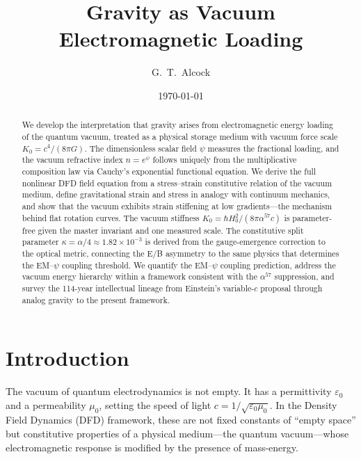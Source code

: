 \documentclass[aps,prd,twocolumn,superscriptaddress,nofootinbib]{revtex4-2}
\begin{document}
\title{Gravity as Vacuum Electromagnetic Loading}

\author{G.~T.~Alcock}

\date{\today}

\begin{abstract}
We develop the interpretation that gravity arises from electromagnetic
energy loading of the quantum vacuum, treated as a physical storage
medium with vacuum force scale $K_0 = c^4/(8\pi G)$.  The dimensionless
scalar field $\psi$ measures the fractional loading, and the vacuum
refractive index $n = e^\psi$ follows uniquely from the multiplicative
composition law via Cauchy's exponential functional equation.  We derive
the full nonlinear DFD field equation from a stress--strain constitutive
relation of the vacuum medium, define gravitational strain and stress
in analogy with continuum mechanics, and show that the vacuum exhibits
strain stiffening at low gradients---the mechanism behind flat rotation
curves.  The vacuum stiffness $K_0 = \hbar H_0^2/(8\pi\alpha^{57}c)$
is parameter-free given the master invariant and one measured scale.
The constitutive split parameter $\kappa = \alpha/4 \approx 1.82 \times 10^{-3}$
is derived from the gauge-emergence correction to the optical metric,
connecting the E/B asymmetry to the same physics that determines the
EM--$\psi$ coupling threshold.
We quantify the EM--$\psi$ coupling prediction, address the vacuum
energy hierarchy within a framework consistent with the $\alpha^{57}$
suppression, and survey the 114-year intellectual lineage from Einstein's
variable-$c$ proposal through analog gravity to the present framework.
\end{abstract}

\maketitle


\section{Introduction}
\label{sec:intro}

The vacuum of quantum electrodynamics is not empty.  It has a
permittivity $\varepsilon_0$ and a permeability $\mu_0$, setting the
speed of light $c = 1/\sqrt{\varepsilon_0\mu_0}$.  In the Density
Field Dynamics (DFD) framework, these are not fixed constants of
``empty space'' but constitutive properties of a physical medium---the
quantum vacuum---whose electromagnetic response is modified by the
presence of mass-energy.
\end{document}
